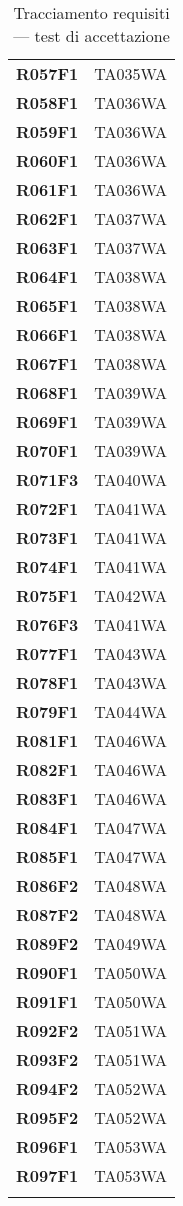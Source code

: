 \documentclass[../../piano-di-qualifica.tex]{subfiles}
\begin{document}
\begin{longtable}[H]{>{\centering\bfseries}m{5cm} >{\centering\arraybackslash}m{5cm}}
  R057F1 &  TA035WA\\
  R058F1 &  TA036WA\\
  R059F1 &  TA036WA\\
  R060F1 &  TA036WA\\
  R061F1 &  TA036WA\\
  R062F1 &  TA037WA\\
  R063F1 &  TA037WA\\
  R064F1 &  TA038WA\\
  R065F1 &  TA038WA\\
  R066F1 &  TA038WA\\
  R067F1 &  TA038WA\\
  R068F1 &  TA039WA\\
  R069F1 &  TA039WA\\
  R070F1 &  TA039WA\\
  R071F3 &  TA040WA\\
  R072F1 &  TA041WA\\
  R073F1 &  TA041WA\\
  R074F1 &  TA041WA\\
  R075F1 &  TA042WA\\
  R076F3 &  TA041WA\\
  R077F1 &  TA043WA\\
  R078F1 &  TA043WA\\
  R079F1 &  TA044WA\\
  R081F1 &  TA046WA\\
  R082F1 &  TA046WA\\
  R083F1 &  TA046WA\\
  R084F1 &  TA047WA\\
  R085F1 &  TA047WA\\
  R086F2 &  TA048WA\\
  R087F2 &  TA048WA\\
  R089F2 &  TA049WA\\
  R090F1 &  TA050WA\\
  R091F1 &  TA050WA\\
  R092F2 &  TA051WA\\
  R093F2 &  TA051WA\\
  R094F2 &  TA052WA\\
  R095F2 &  TA052WA\\
  R096F1 &  TA053WA\\
  R097F1 &  TA053WA\\

  \rowcolor{white}
  \caption{Tracciamento requisiti --- test di accettazione}%
  \label{tab:tabella_tracciamento_requisiti_test_accettazione}
\end{longtable}
\end{document}
